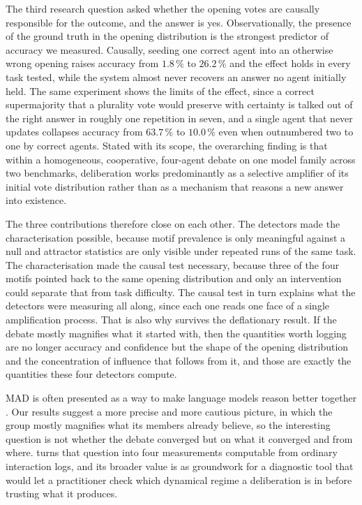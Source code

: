 The third research question asked whether the opening votes are causally
responsible for the outcome, and the answer is yes. Observationally, the presence
of the ground truth in the opening distribution is the strongest predictor of
accuracy we measured. Causally, seeding one correct agent into an otherwise wrong
opening raises accuracy from $1.8\,\%$ to $26.2\,\%$ and the effect holds in
every task tested, while the system almost never recovers an answer no agent
initially held.
The same experiment shows the limits of the effect, since a correct supermajority
that a plurality vote would preserve with certainty is talked out of the right
answer in roughly one repetition in seven, and a single agent that never updates
collapses accuracy from $63.7\,\%$ to $10.0\,\%$ even when outnumbered two to one
by correct agents. Stated with its scope, the overarching finding is that within
a homogeneous, cooperative, four-agent debate on one model family across two
benchmarks, deliberation works predominantly as a selective amplifier of its
initial vote distribution rather than as a mechanism that reasons a new answer
into existence.

The three contributions therefore close on each other. The detectors made the
characterisation possible, because motif prevalence is only meaningful against a
null and attractor statistics are only visible under repeated runs of the same
task. The characterisation made the causal test necessary, because three of the
four motifs pointed back to the same opening distribution and only an
intervention could separate that from task difficulty. The causal test in turn
explains what the detectors were measuring all along, since each one reads
one face of a single amplification process. That is also why \suitename{}
survives the deflationary result. If the debate mostly magnifies what it started
with, then the quantities worth logging are no longer accuracy and confidence but
the shape of the opening distribution and the concentration of influence that
follows from it, and those are exactly the quantities these four detectors
compute.

\ac{MAD} is often presented as a way to make language models reason
better together \citep{du2024improving, liang2024encouraging}. Our results
suggest a more precise and more cautious picture, in which the group mostly
magnifies what its members already believe, so the interesting question is not
whether the debate converged but on what it converged and from where.
\suitename{} turns that question into four measurements computable from ordinary
interaction logs, and its broader value is as groundwork for a diagnostic
tool that would let a practitioner check which dynamical regime a
deliberation is in before trusting what it produces.